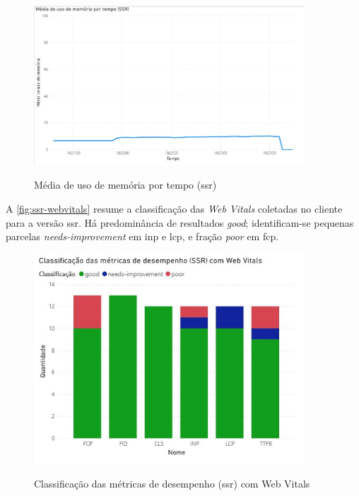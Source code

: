 \begin{figure}[H]
  \centering
  \caption{Média de uso de memória por tempo (\acrshort{ssr})}
  \includegraphics[width=0.9\textwidth]{media/uso_memoria_ssr.jpeg}
  \label{fig:ssr-mem}
\end{figure}


A \autoref{fig:ssr-webvitals} resume a classificação das \textit{Web Vitals} coletadas no cliente para a versão \acrshort{ssr}. Há predominância de resultados \textit{good}; identificam-se pequenas parcelas \textit{needs-improvement} em \acrshort{inp} e \acrshort{lcp}, e fração \textit{poor} em \acrshort{fcp}.

\begin{figure}[H]
  \centering
  \caption{Classificação das métricas de desempenho (\acrshort{ssr}) com Web Vitals}
  \includegraphics[width=0.9\textwidth]{media/metricas_ssr_web_vitals.jpeg}
  \label{fig:ssr-webvitals}
\end{figure}


